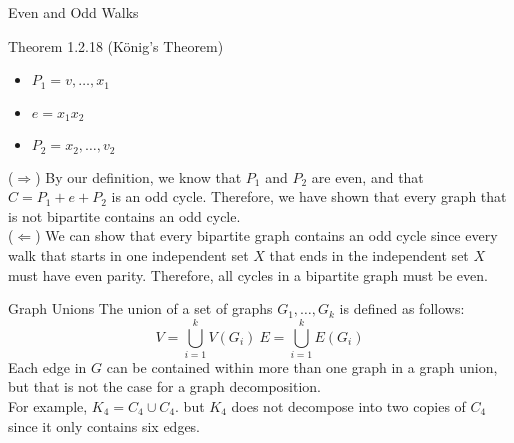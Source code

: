 \documentclass[10pt]{extarticle}
\begin{document}
\begin{problem}{Even and Odd Walks}
\begin{problem}{Theorem 1.2.18 (König's Theorem)}
    \begin{itemize}
      \item $P_1 = v,\dots,x_1$
      \item $e = x_1x_2$
      \item $P_2 = x_2,\dots,v_2$
    \end{itemize}
    ($\Rightarrow$) By our definition, we know that $P_1$ and $P_2$ are even, and that $C = P_1 + e + P_2$ is an odd cycle. Therefore, we have shown that every graph that is not bipartite contains an odd cycle.\\
    
    ($\Leftarrow$) We can show that every bipartite graph contains an odd cycle since every walk that starts in one independent set $X$ that ends in the independent set $X$ must have even parity. Therefore, all cycles in a bipartite graph must be even.
  \end{problem}
\end{problem}
\begin{problem}{Graph Unions}
  The union of a set of graphs $G_1,\dots,G_k$ is defined as follows:
  \[
    V = \bigcup_{i = 1}^{k} V(G_i)~ E = \bigcup_{i = 1}^{k} E(G_i)
  \]
  Each edge in $G$ can be contained within more than one graph in a graph union, but that is not the case for a graph decomposition.\\

  For example, $K_4 = C_4 \cup C_4$. but $K_4$ does not decompose into two copies of $C_4$ since it only contains six edges.
\end{problem}
\end{document}
